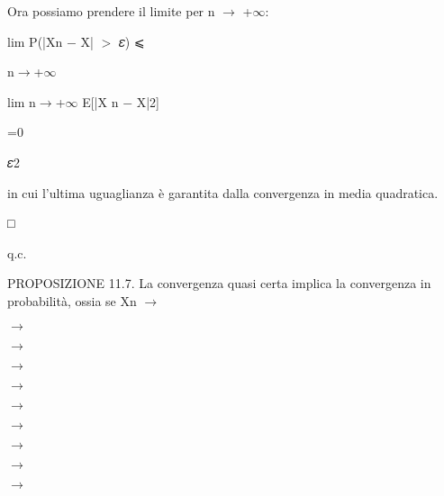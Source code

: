 \documentclass[a4paper,portrait,12pt]{article}
\begin{document}
\begin{flushleft}
Ora possiamo prendere il limite per n $\rightarrow$ +$\infty$:
\end{flushleft}


\begin{flushleft}
lim P(|Xn $-$ X| $>$ 𝜀) ⩽
\end{flushleft}





\begin{flushleft}
n$\rightarrow$+$\infty$
\end{flushleft}





\begin{flushleft}
lim n$\rightarrow$+$\infty$ E[|X n $-$ X|2]
\end{flushleft}


=0


\begin{flushleft}
𝜀2
\end{flushleft}





\begin{flushleft}
in cui l'ultima uguaglianza \`{e} garantita dalla convergenza in media quadratica.
\end{flushleft}





□


\begin{flushleft}
q.c.
\end{flushleft}





\begin{flushleft}
PROPOSIZIONE 11.7. La convergenza quasi certa implica la convergenza in probabilit\`{a}, ossia se Xn $\rightarrow$
\end{flushleft}


$\rightarrow$


$\rightarrow$


$\rightarrow$


$\rightarrow$


$\rightarrow$


$\rightarrow$


$\rightarrow$


$\rightarrow$


$\rightarrow$
\end{document}

